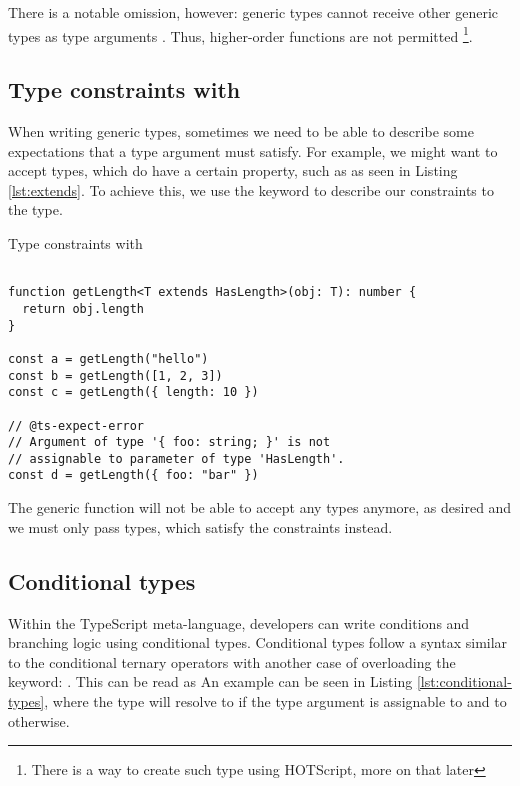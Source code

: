 There is a notable omission, however: generic types cannot receive other generic types as type arguments \cite{TypeInferenceHigherorder}. Thus, higher-order functions are not permitted \footnote{There is a way to create such type using HOTScript, more on that later}.

\subsection{Type constraints with }

When writing generic types, sometimes we need to be able to describe some expectations that a type argument must satisfy. For example, we might want to accept types, which do have a certain property, such as  as seen in Listing \ref{lst:extends}. To achieve this, we use the  keyword to describe our constraints to the type.

\begin{listing}[ht]
  \caption{Type constraints with }\label{lst:extends}
  \begin{verbatim}

function getLength<T extends HasLength>(obj: T): number {
  return obj.length
}

const a = getLength("hello")
const b = getLength([1, 2, 3])
const c = getLength({ length: 10 })

// @ts-expect-error 
// Argument of type '{ foo: string; }' is not 
// assignable to parameter of type 'HasLength'.
const d = getLength({ foo: "bar" })
\end{verbatim}
\end{listing}

The generic function will not be able to accept any types anymore, as desired and we must only pass types, which satisfy the constraints instead.

\subsection{Conditional types}

Within the TypeScript meta-language, developers can write conditions and branching logic using conditional types. Conditional types follow a syntax similar to the conditional ternary operators with another case of overloading the  keyword: . This can be read as  An example can be seen in Listing \ref{lst:conditional-types}, where the  type will resolve to  if the type argument  is assignable to  and to  otherwise.


